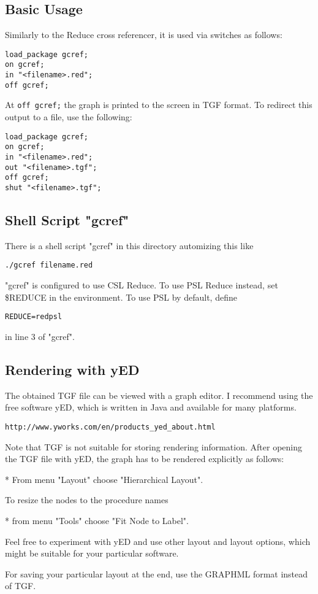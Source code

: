 
\subsection{Basic Usage}


Similarly to the Reduce cross referencer, it is used via switches as follows:
\begin{verbatim}
load_package gcref;
on gcref;
in "<filename>.red";
off gcref;
\end{verbatim}
At \texttt{off gcref;} the graph is printed to the screen in TGF format. 
To redirect this output to a file, use the following:
\begin{verbatim}
load_package gcref;
on gcref;
in "<filename>.red";
out "<filename>.tgf";
off gcref;
shut "<filename>.tgf";
\end{verbatim}

\subsection{Shell Script "gcref"}

There is a shell script "gcref" in this directory automizing this like
\begin{verbatim}
./gcref filename.red
\end{verbatim}
"gcref" is configured to use CSL Reduce. To use PSL Reduce instead, set
\$REDUCE in the environment. To use PSL by default, define
\begin{verbatim}
REDUCE=redpsl
\end{verbatim}
in line 3 of "gcref".


\subsection{Rendering with yED}

The obtained TGF file can be viewed with a graph editor. I recommend using the
free software yED, which is written in Java and available for many platforms.
\begin{verbatim}
http://www.yworks.com/en/products_yed_about.html
\end{verbatim}
Note that TGF is not suitable for storing rendering information. After opening
the TGF file with yED, the graph has to be rendered explicitly as follows:

* From menu "Layout" choose "Hierarchical Layout".

To resize the nodes to the procedure names

* from menu "Tools" choose "Fit Node to Label".

Feel free to experiment with yED and use other layout and layout options, which
might be suitable for your particular software.

For saving your particular layout at the end, use the GRAPHML format instead of
TGF.
